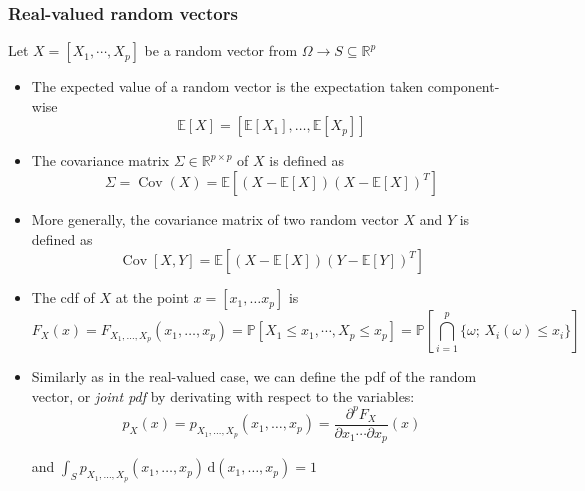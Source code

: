 \documentclass[a4paper,11pt]{article}
\newcommand{\Ex}{\mathbb{E}}
\newcommand{\Prob}{\mathbb{P}}
\DeclareMathOperator{\Cov}{\mathrm{Cov}}
\theoremstyle{defi}
\numberwithin{thmCounter}{section}
\begin{document}
\subsubsection{Real-valued random vectors}
\begin{definition}
 \label{def:joint_marginal_cond_densities}
 Let $X=[X_1,\cdots,X_p]$ be a random vector from $\Omega \rightarrow S\subseteq\mathbb{R}^p$

 \begin{itemize}
 \item The expected value of a random vector is the expectation taken component-wise
  \begin{equation*}
    \Ex[X] = \left[\Ex[X_1],\dots,\Ex[X_p]\right]
  \end{equation*}
  
\item The covariance matrix $\Sigma \in \mathbb{R}^{p\times p}$ of $X$ is defined as
  \begin{equation*}
    \Sigma = \Cov(X)= \Ex\left[\left(X - \Ex[X]\right)\left(X-\Ex[X]\right)^T\right]
  \end{equation*}
  
\item More generally, the covariance matrix of two random vector $X$ and $Y$ is defined as
  \begin{equation*}
    \Cov\left[X,Y\right] = \Ex\left[(X-\Ex[X])(Y - \Ex[Y])^T\right]
  \end{equation*}
 \item The cdf of $X$ at the point $x=[x_1,\dots x_p]$ is
  \begin{equation*}
    F_{X}(x) = F_{X_1,\dots, X_p}(x_1,\dots, x_p) = \Prob\left[X_1 \leq x_1, \cdots, X_p\leq x_p\right] = \Prob\left[\bigcap_{i=1}^p \{\omega;\,X_i(\omega) \leq x_i\}\right]
  \end{equation*}
  
\item Similarly as in the real-valued case, we can define the pdf of the random vector, or \emph{joint pdf} by derivating with respect to the variables:
  \begin{equation*}
    p_{X}(x)= p_{X_1,\dots, X_p}(x_1,\dots, x_p) =\frac{\partial^p F_X}{\partial x_1 \cdots \partial x_p}(x)
  \end{equation*}
  
  and $\int_{S}p_{X_1,\dots, X_p}(x_1,\dots, x_p)\,\mathrm{d}(x_1,\dots, x_p)=1$


\end{itemize}
\end{definition}
\end{document}
